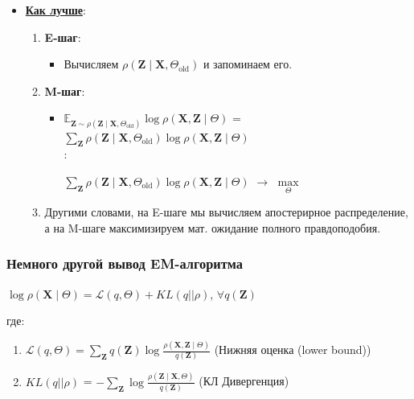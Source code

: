\begin{itemize}
            \item \underline{\textbf{Как лучше}}:
            \begin{enumerate}
                \item {\textbf{E-шаг}}:
                \begin{itemize}
                    \item Вычисляем $\rho(\mathbf{Z} \mid \mathbf{X}, \Theta_{\text{old}})$ и запоминаем его.
                \end{itemize}
                \item {\textbf{M-шаг}}:
                \begin{itemize}
                    \item $\mathbb{E}_{\mathbf{Z} \sim \rho(\mathbf{Z} \mid \mathbf{X}, \Theta_{\text{old}})} \log \rho(\mathbf{X}, \mathbf{Z} \mid \Theta)$ = $\sum\limits_{\mathbf{Z}}  \rho(\mathbf{Z} \mid \mathbf{X}, \Theta_{\text{old}}) \log \rho(\mathbf{X}, \mathbf{Z} \mid \Theta)$\\

                    :
                    \begin{center}
                        \Large
                        $\sum\limits_{\mathbf{Z}}  \rho(\mathbf{Z} \mid \mathbf{X}, \Theta_{\text{old}}) \log \rho(\mathbf{X}, \mathbf{Z} \mid \Theta)$ $\longrightarrow$ $\max\limits_{\Theta }$
                    \end{center}
                \end{itemize}
                
                \item Другими словами, на E-шаге мы вычисляем апостерирное распределение, а на M-шаге максимизируем мат. ожидание полного правдоподобия.
            \end{enumerate}
        \end{itemize}

    \subsubsection{Немного другой вывод EM-алгоритма}

        \begin{center}
        \Large
            $\log \rho(\mathbf{X} \mid \Theta) = \mathcal{L}(q, \Theta) + KL(q || \rho)$, \quad\quad $\forall q(\mathbf{Z})$
        \end{center}
        где:
        \begin{enumerate}
        \Large
            \item $\mathcal{L}(q, \Theta) = \sum\limits_{\mathbf{Z}} q(\mathbf{Z}) \log \frac{\rho (\mathbf{X}, \mathbf{Z} \mid \Theta)}{q(\mathbf{Z})}$ (Нижняя оценка (lower bound))

            \item $KL(q || \rho)$ = $-\sum\limits_{\mathbf{Z}} \log \frac{\rho (\mathbf{Z} \mid \mathbf{X}, \Theta)}{q(\mathbf{Z})}$ (КЛ Дивергенция)
        \end{enumerate}

